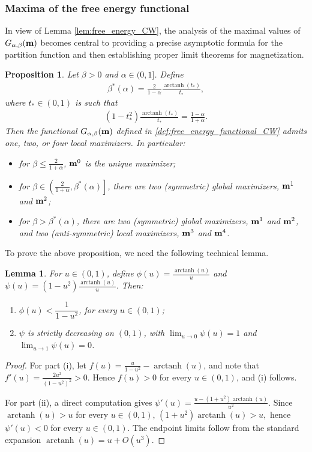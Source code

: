 \documentclass[11pt,oneside]{amsart}
\numberwithin{equation}{section}  %
\theoremstyle{plain}
\newtheorem{lemma}[theorem]{Lemma}
\newtheorem{proposition}[theorem]{Proposition}
\theoremstyle{remark}
\def \bm {{\bf m}}
\begin{document}
\subsubsection{Maxima of the free energy functional}
In view of Lemma \ref{lem:free_energy_CW}, the analysis of the maximal values of  $G_{\alpha,\beta}(\bm)$ becomes central to providing a precise asymptotic formula for the partition function and then establishing proper limit theorems for magnetization.
%
\begin{proposition}\label{proposition:minima1}
Let $\beta>0$ and $\alpha \in (0,1]$. Define
\begin{align}\label{def:betastar}
    \beta^* (\alpha)= \frac{2}{1-\alpha} \frac{\operatorname{arctanh}(t_*)}{t_*},
\end{align}
where $t_* \in (0,1)$ is such that
\begin{align}\label{def:tstar} 
   (1-t_*^2)\frac{\operatorname{arctanh}(t_*)}{t_*}=\frac{1-\alpha}{1+\alpha}.
\end{align}
Then the functional $G_{\alpha,\beta}(\bm)$ defined in \eqref{def:free_energy_functional_CW} admits one, two, or four local maximizers. In particular:
    \begin{itemize}
        \item[(i)] for $\beta\le \frac{2}{1+\alpha}$, $\bm^0$ is the unique maximizer;
        \item[(ii)] for $\beta \in \left (\frac{2}{1+\alpha}, \beta^*(\alpha)\right ]$, there are two (symmetric) global maximizers, $\bm^1$ and $\bm^2$;
        \item[(iii)] for $\beta > \beta^*(\alpha)$, there are two (symmetric) global maximizers, $\bm^1$ and $\bm^2$, and two (anti-symmetric) local maximizers, $\bm^3$ and $\bm^4$.
    \end{itemize}
\end{proposition}
To prove the above proposition, we need the following technical lemma. 
\begin{lemma}\label{lem:elementary-ineq}
For $u \in (0,1)$, define
$\phi(u)=\frac{\operatorname{arctanh}(u)}{u}$ and 
$\psi(u)=(1-u^2)\frac{\operatorname{arctanh}(u)}{u}$.
Then:
\begin{enumerate}[label=\rm(\roman*)]
\item $\phi(u)<\dfrac{1}{1-u^2}$,  for every $u\in(0,1)$;
\item $\psi$ is strictly decreasing on $(0,1)$, with $\lim_{u \to 0}\psi(u)=1$ and 
$\lim_{u \to 1}\psi(u)=0$.
\end{enumerate}
\end{lemma}
\begin{proof}
For part (i), let 
$f(u)=\frac{u}{1-u^2}-\operatorname{arctanh}(u)$,
and note that 
$f'(u)=\frac{2u^2}{(1-u^2)^2}>0$.
Hence $f(u)>0$ for every $u\in(0,1)$, and (i) follows. 

For part (ii), a direct computation gives
$\psi'(u)=\frac{u-(1+u^2)\operatorname{arctanh}(u)}{u^2}$.
Since $\operatorname{arctanh}(u)>u$ for every $u\in(0,1)$,
$
(1+u^2)\operatorname{arctanh}(u)>u,
$
hence $\psi'(u)<0$ for every $u\in(0,1)$. The endpoint limits follow from the standard expansion
$
\operatorname{arctanh}(u)=u+O(u^3)
$.
\end{proof}
\end{document}
